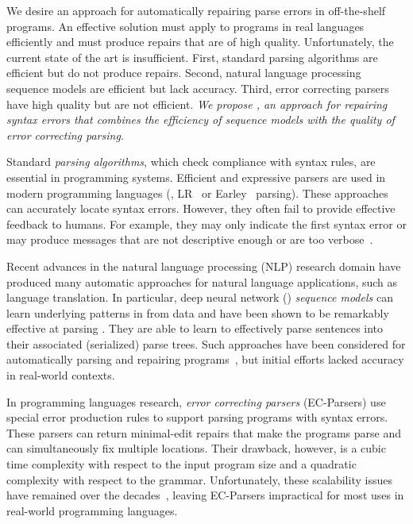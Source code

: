 We desire an approach for automatically repairing parse errors in
off-the-shelf programs. An effective solution must apply to programs in
real languages efficiently and must produce repairs that are of high
quality. Unfortunately, the current state of the art is insufficient.  
First, standard parsing algorithms are efficient but do not produce repairs. 
Second, natural language processing sequence models are efficient but lack
accuracy. 
Third, error correcting parsers have high quality but are not efficient.
\emph{We propose \toolname, an approach for repairing syntax errors that
combines the efficiency of sequence models with the quality of error
correcting parsing.}

Standard \emph{parsing algorithms}, which check compliance with syntax rules, are
essential in programming systems. 
Efficient and expressive parsers are used in modern programming languages (\eg,
LR~\citep{Aho1974} or Earley~\citep{Earley_1970} parsing). These 
approaches can accurately locate syntax errors. However,
they often fail to provide effective feedback to humans. For 
example, they may only indicate the first syntax error or may produce
messages that are not descriptive enough or are too
verbose~\citep{Kummerfeld2003, Ahadi_2018, VanDerSpek_2005}. 
% 

Recent advances in the natural language processing (NLP) research domain
\citep{Sutskever_2014, Hardalov_2018} have produced many automatic approaches
for natural language applications, such as language translation. In
particular, deep neural network (\dnn) \emph{sequence models} can learn
underlying patterns in from data and have been shown to be remarkably
effective at parsing \citep{Vinyals2015}. They are able to learn to
effectively parse sentences into their associated (serialized) parse trees.
Such approaches have been considered for automatically parsing and
repairing programs~\citep{Ahmed_2021}, but initial efforts lacked accuracy
in real-world contexts. 

In programming languages research, \emph{error
correcting parsers} (EC-Parsers) \citep{Aho_1972} use special error production
rules to support parsing programs with syntax errors. These parsers can return
minimal-edit repairs that make the programs parse and can simultaneously fix
multiple locations. Their drawback,
however, is a cubic time complexity with respect to the
input program size and a quadratic complexity with respect to the grammar.
% 
Unfortunately, these scalability issues have remained over the
decades~\citep{McLean1996, Rajasekaran2014}, leaving EC-Parsers
impractical for most uses in real-world programming languages.

